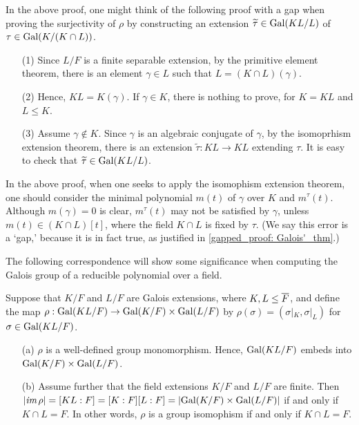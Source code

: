 \begin{rmk}
    In the above proof, one might think of the following proof with a gap when proving the surjectivity of $\rho$ by constructing an extension $\widetilde{\tau}\in{\textrm{Gal}({KL/L})}$ of $\tau\in{\textrm{Gal}({K/(K\cap L)})}$.
    
    \begin{enumerate}
        \item[(1)]
        {
            Since $L/F$ is a finite separable extension, by the primitive element theorem, there is an element $\gamma\in L$ such that $L=(K\cap L)(\gamma)$.
        }
        \item[(2)]
        {
            Hence, $KL=K(\gamma)$.
            If $\gamma\in K$, there is nothing to prove, for $K=KL$ and $L\leq K$.
        }
        \item[(3)]
        {
            Assume $\gamma\notin K$.
            \color{red}Since $\gamma$ is an algebraic conjugate of $\gamma$, by the isomoprhism extension theorem, there is an extension $\widetilde{\tau}: KL\rightarrow KL$ extending $\tau$. \color{black}
            It is easy to check that $\widetilde{\tau}\in{\textrm{Gal}({KL/L})}$.
        }
    \end{enumerate}
    In the above proof, when one seeks to apply the isomophism extension theorem, one should consider the minimal polynomial $m(t)$ of $\gamma$ over $K$ and $m^\tau(t)$.
    Although $m(\gamma)=0$ is clear, \color{red}$m^\tau(t)$ may not be satisfied by $\gamma$, unless $m(t)\in (K\cap L)[t]$\color{black}, where the field $K\cap L$ is fixed by $\tau$.
    (We say this error is a `gap,' because it is in fact true, as justified in \cref{gapped_proof: Galois'_thm}.)
\end{rmk}

The following correspondence will show some significance when computing the Galois group of a reducible polynomial over a field.
\begin{prop}
    Suppose that $K/F$ and $L/F$ are Galois extensions, where $K, L\leq\overline{F}$, and define the map $\rho: {\textrm{Gal}({KL/F})}\rightarrow{\textrm{Gal}({K/F})}\times{\textrm{Gal}({L/F})}$ by $\rho(\sigma)=(\sigma|_K, \sigma|_L)$ for $\sigma\in{\textrm{Gal}({KL/F})}$.
    \begin{enumerate}
        \item[(a)]
        {
            $\rho$ is a well-defined group monomorphism.    
            Hence, ${\textrm{Gal}({KL/F})}$ embeds into ${\textrm{Gal}({K/F})}\times{\textrm{Gal}({L/F})}$.
        }
        \item[(b)]
        {
            Assume further that the field extensions $K/F$ and $L/F$ are finite.
            Then $|\textit{im\,}\rho|=[KL:F]=[K:F][L:F]=|{\textrm{Gal}({K/F})}\times{\textrm{Gal}({L/F})}|$ if and only if $K\cap L=F$.
            In other words, $\rho$ is a group isomophism if and only if $K\cap L=F$.
        }
    \end{enumerate}
\end{prop}

